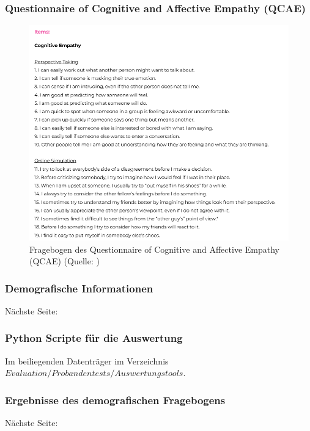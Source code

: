 \documentclass[
	12pt,
	a4paper,
	bibtotoc,
	cleardoubleempty, 
	idxtotoc,
	ngerman,
	openright
	final,
	listof=nochaptergap,
	]{scrbook}
\begin{document}
\begin{appendices}
\clearpage

\subsubsection{Questionnaire of Cognitive and Affective Empathy (QCAE)}

\begin{figure}[ht]
\centering
\includegraphics[width=1\linewidth]{content/attachments/questtionaires/QCAE.PNG}
\caption{Fragebogen des Questionnaire of Cognitive and Affective Empathy (QCAE) (Quelle: \citealp{noauthor_questionnaire_nodate})}
\label{fig:append_QCAE}
\end{figure}

\subsubsection{Demografische Informationen}\label{sec:append_study_demografic}
Nächste Seite:


\subsubsection{Python Scripte für die Auswertung}
Im beiliegenden Datenträger im Verzeichnis $Evaluation/Probandentests/Auswertungstools$. 

\subsubsection{Ergebnisse des demografischen Fragebogens}
Nächste Seite:


\end{appendices}
\end{document}

